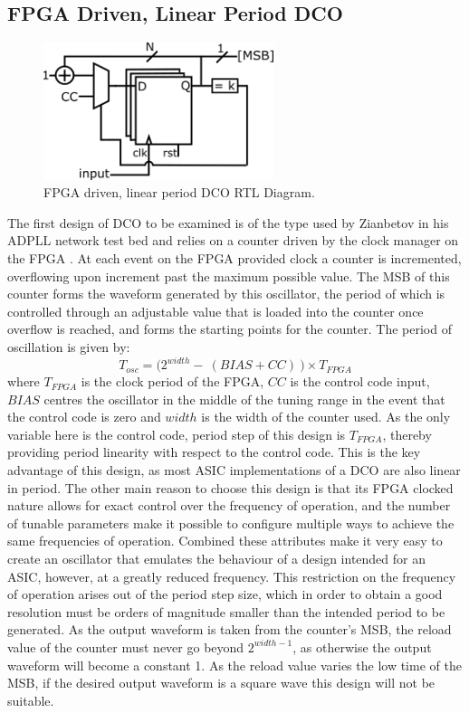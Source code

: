 \subsection{\acs{FPGA} Driven, Linear Period \acs{DCO}}
\begin{figure}[h]
	\centering
	\includegraphics[width=0.6\textwidth]{../osc1}
	\caption{\acs{FPGA} driven, linear period \acs{DCO} \ac{RTL} Diagram.}
	\label{fig:osc1}
\end{figure}
The first design of \ac{DCO} to be examined is of the type used by Zianbetov in his \ac{ADPLL} network test bed and relies on a counter driven by the clock manager on the \ac{FPGA} \cite{zianbetov2013phd}. At each event on the \ac{FPGA} provided clock a counter is incremented, overflowing upon increment past the maximum possible value. The \ac{MSB} of this counter forms the waveform generated by this oscillator, the period of which is controlled through an adjustable value that is loaded into the counter once overflow is reached, and forms the starting points for the counter. The period of oscillation is given by:
\begin{equation}
	T_{osc} = \big(2^{width} -~(BIAS+CC)~\big)\times T_{FPGA}
\end{equation}
where $T_{FPGA}$ is the clock period of the \ac{FPGA}, $CC$ is the control code input, $BIAS$ centres the oscillator in the middle of the tuning range in the event that the control code is zero and $width$ is the width of the counter used. As the only variable here is the control code, period step of this design is $T_{FPGA}$, thereby providing period linearity with respect to the control code. This is the key advantage of this design, as most \ac{ASIC} implementations of a \ac{DCO} are also linear in period. The other main reason to choose this design is that its \ac{FPGA} clocked nature allows for exact control over the frequency of operation, and the number of tunable parameters make it possible to configure multiple ways to achieve the same frequencies of operation. Combined these attributes make it very easy to create an oscillator that emulates the behaviour of a design intended for an \ac{ASIC}, however, at a greatly reduced frequency. This restriction on the frequency of operation arises out of the period step size, which in order to obtain a good resolution must be orders of magnitude smaller than the intended period to be generated. As the output waveform is taken from the counter's \ac{MSB}, the reload value of the counter must never go beyond $2^{width-1}$, as otherwise the output waveform will become a constant 1. As the reload value varies the low time of the \ac{MSB}, if the desired output waveform is a square wave this design will not be suitable.

